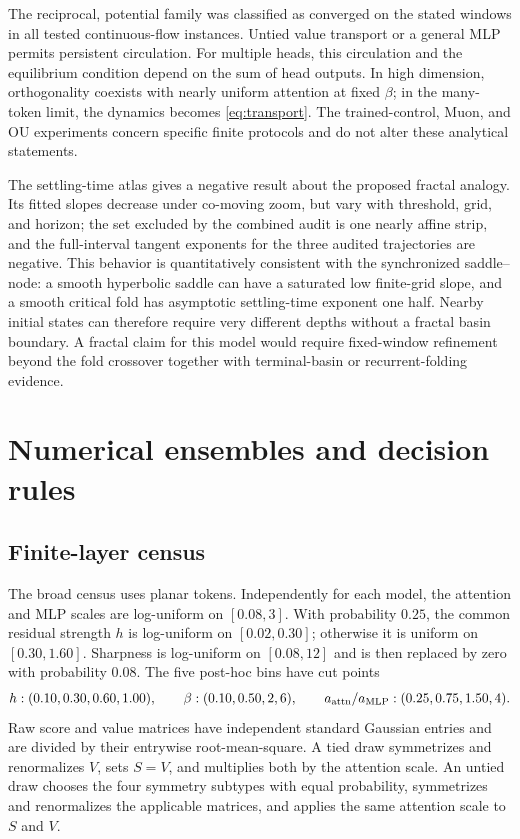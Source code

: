 \documentclass[11pt,a4paper]{article}
\theoremstyle{definition}
\begin{document}
The reciprocal, potential family was classified as converged on the stated windows in
all tested continuous-flow instances. Untied value transport or a general MLP permits
persistent circulation.
For multiple heads, this circulation and the equilibrium condition depend on the sum
of head outputs. In high dimension, orthogonality coexists with nearly uniform
attention at fixed $\beta$; in the many-token limit, the dynamics becomes
\eqref{eq:transport}. The trained-control, Muon, and OU experiments concern specific
finite protocols and do not alter these analytical statements.

The settling-time atlas gives a negative result about the proposed fractal analogy.
Its fitted slopes decrease under co-moving zoom, but vary with threshold, grid, and
horizon; the set excluded by the combined audit is one nearly affine strip, and the
full-interval tangent exponents for the three audited trajectories are negative.
This behavior is quantitatively consistent with the synchronized saddle--node: a
smooth hyperbolic saddle can have a saturated low finite-grid slope, and a smooth
critical fold has asymptotic settling-time exponent one half.  Nearby initial states
can therefore require very different depths without a fractal basin boundary.  A
fractal claim for this model would require fixed-window refinement beyond the fold
crossover together with terminal-basin or recurrent-folding evidence.

\appendix
\section{Numerical ensembles and decision rules}
\label{sec:numerical-ensembles}

\subsection{Finite-layer census}

The broad census uses planar tokens.  Independently for each model, the attention
and MLP scales are log-uniform on $[0.08,3]$.  With probability $0.25$, the common
residual strength $h$ is log-uniform on $[0.02,0.30]$; otherwise it is uniform on
$[0.30,1.60]$.  Sharpness is log-uniform on $[0.08,12]$ and is then replaced by zero
with probability $0.08$.  The five post-hoc bins have cut points
\[
 h:(0.10,0.30,0.60,1.00),\qquad
 \beta:(0.10,0.50,2,6),\qquad
 a_{\rm attn}/a_{\rm MLP}:(0.25,0.75,1.50,4).
\]
Raw score and value matrices have independent standard Gaussian entries and are
divided by their entrywise root-mean-square.  A tied draw symmetrizes and renormalizes
$V$, sets $S=V$, and multiplies both by the attention scale.  An untied draw chooses
the four symmetry subtypes with equal probability, symmetrizes and renormalizes the
applicable matrices, and applies the same attention scale to $S$ and $V$.
\end{document}

